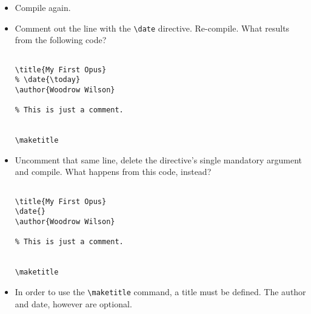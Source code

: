 \begin{itemize}
\item Compile again.

\item Comment out the line with the \texttt{\textbackslash date}
  directive. Re-compile. What results from the following code?

\begin{center}
  \begin{minipage}{.8\linewidth}
    \begin{framed}
\begin{verbatim}

\title{My First Opus}
% \date{\today}
\author{Woodrow Wilson}

% This is just a comment.


\maketitle
\end{verbatim}
    \end{framed}
  \end{minipage}
\end{center}


\item Uncomment that same line, delete the directive's single mandatory argument
  and compile. What happens from this code, instead?

\begin{center}
  \begin{minipage}{.8\linewidth}
    \begin{framed}
\begin{verbatim}

\title{My First Opus}
\date{}
\author{Woodrow Wilson}

% This is just a comment.


\maketitle
\end{verbatim}
    \end{framed}
  \end{minipage}
\end{center}

\item In order to use the \texttt{\textbackslash{}maketitle} command, a title
  must be defined. The author and date, however are optional.

\end{itemize}

